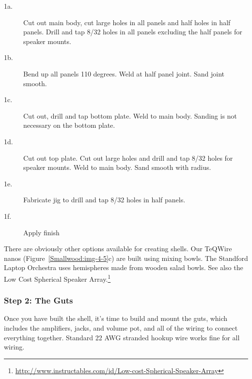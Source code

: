 \begin{description}
	\item[1a.] Cut out main body, cut large holes in all panels and half holes in half
panels. Drill and tap 8/32 holes in all panels excluding the half panels for
speaker mounts.

	\item[1b.] Bend up all panels 110 degrees. Weld at half panel joint. Sand joint
smooth.

	\item[1c.] Cut out, drill and tap bottom plate. Weld to main body. Sanding is not
necessary on the bottom plate.

	\item[1d.] Cut out top plate. Cut out large holes and drill and tap 8/32 holes for
speaker mounts. Weld to main body. Sand smooth with radius.

	\item[1e.] Fabricate jig to drill and tap 8/32 holes in half panels.

	\item[1f.] Apply finish
\end{description}


There are obviously other options available for creating shells. Our TeQWire nanos (Figure~\ref{Smallwood:img-4-5}c) are built using mixing bowls.  The Standford Laptop Orchestra uses hemispheres made from wooden salad bowls.  See also the Low Cost Spherical Speaker Array.\footnote{\url{http://www.instructables.com/id/Low-cost-Spherical-Speaker-Array}}

\subsubsection{Step 2: The Guts}

Once you have built the shell, it's time to build and mount the guts, which
includes the amplifiers, jacks, and volume pot, and all of the wiring to connect
everything together.  Standard 22 AWG stranded hookup wire works fine for all
wiring.

